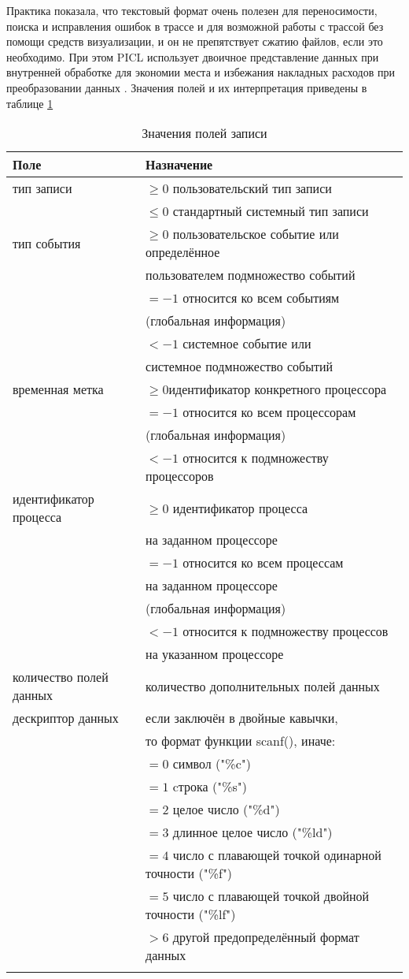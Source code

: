     Практика показала, что текстовый формат очень полезен для переносимости, поиска и исправления ошибок в трассе и для возможной работы с трассой без помощи средств визуализации, и он не препятствует сжатию файлов, если это необходимо. При этом PICL использует двоичное представление данных при внутренней обработке для экономии места и избежания накладных расходов при преобразовании данных \cite{book4}.
Значения полей и их интерпретация приведены в таблице \ref{tab:tbl2}
\begin{table}[h!]
	\caption{\label{tab:tbl2} Значения полей записи}
	\begin{tabular}{|l|l|}
		\hline
		Поле & Назначение \\
		\hline\hline
		тип записи& $\geq0$ пользовательский тип записи\tabularnewline & $\le0$ стандартный системный тип записи
		\\\hline
		тип события & $\geq0$ пользовательское событие или определённое \tabularnewline & пользователем подмножество событий\tabularnewline & $=-1$ относится ко всем событиям \tabularnewline &(глобальная информация)
		\tabularnewline & $<-1$ системное событие или \tabularnewline &системное подмножество событий
		\\\hline
		временная метка& $\geq0$идентификатор конкретного процессора\tabularnewline & $=-1$ относится ко всем процессорам \tabularnewline &(глобальная информация)
		\tabularnewline & $<-1$ относится к подмножеству процессоров
		\\\hline
		идентификатор процесса
		&$\geq0$ идентификатор процесса\tabularnewline & на заданном процессоре\tabularnewline & $=-1$ относится ко всем процессам\tabularnewline & на заданном процессоре \tabularnewline &(глобальная информация)
		\tabularnewline & $<-1$ относится к подмножеству процессов\tabularnewline & на указанном процессоре
		\\\hline
		количество полей данных	
		&количество дополнительных полей данных	
		\\\hline
          дескриптор данных
		& если заключён в двойные кавычки,\tabularnewline & то формат функции scanf(),
		иначе:\tabularnewline &
		$=0$  символ ("\%c") \tabularnewline & $=1$ cтрока ("\%s") \tabularnewline &
		$=2$ целое число ("\%d") \tabularnewline &
		$=3$ длинное целое число  ("\%ld") \tabularnewline &
	    $=4$ число с плавающей точкой одинарной точности  ("\%f") \tabularnewline &
	    $=5$ число с плавающей точкой двойной точности   ("\%lf") \tabularnewline &
	    $>6$ другой предопределённый формат данных \tabularnewline &
	    
		
		\\\hline
	
	\end{tabular}
\end{table}
